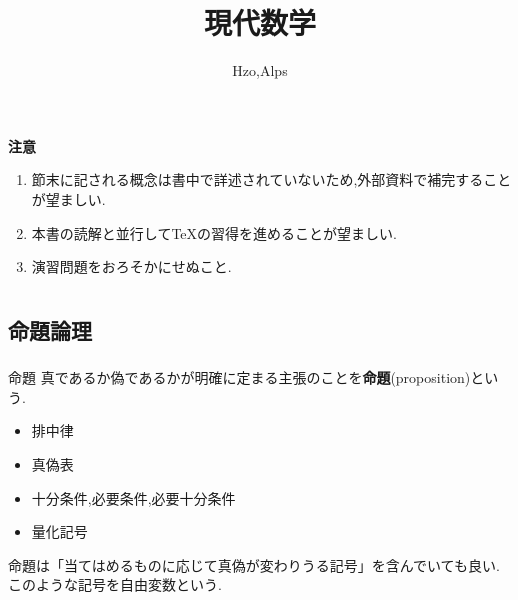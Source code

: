 \documentclass[dvipdfmx,b4j]{jsarticle}
\begin{document}
\title{現代数学}
\author{Hzo,Alps}
\maketitle

\begin{framed}
\textbf{注意}
\begin{enumerate}
    \item 節末に記される概念は書中で詳述されていないため,外部資料で補完することが望ましい.
    \item 本書の読解と並行して\TeX の習得を進めることが望ましい.
    \item 演習問題をおろそかにせぬこと.
\end{enumerate}
\end{framed}
\tableofcontents

\section{}
%
\subsection{命題論理}
\subsubsection{}
\begin{definition}{命題}{}
真であるか偽であるかが明確に定まる主張のことを\textbf{命題}(proposition)という.
\end{definition}
\begin{itemize}
  \item 排中律
  \item 真偽表
  \item 十分条件,必要条件,必要十分条件
  \item 量化記号
\end{itemize}

命題は「当てはめるものに応じて真偽が変わりうる記号」を含んでいても良い.このような記号を自由変数という.
%
\end{document}

